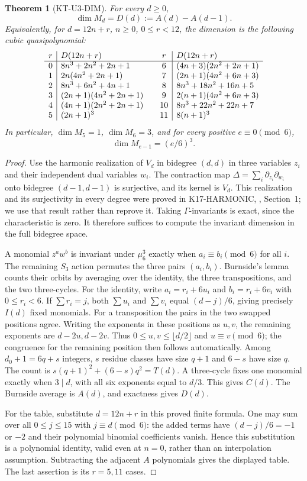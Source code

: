 \documentclass[11pt,a4paper]{article}
\newtheorem{theorem}{Theorem}[section]
\theoremstyle{definition}
\begin{document}
\begin{theorem}[KT-U3-DIM]
For every $d\geq0$,
\[
       \dim M_d=D(d):=A(d)-A(d-1).
\]
Equivalently, for $d=12n+r$, $n\geq0$, $0\leq r<12$, the
dimension is the following cubic quasipolynomial:
\[
\begin{array}{c|l@{\qquad}c|l}
r&D(12n+r)&r&D(12n+r)\\\hline
0&8n^3+2n^2+2n+1&6&(4n+3)(2n^2+2n+1)\\
1&2n(4n^2+2n+1)&7&(2n+1)(4n^2+6n+3)\\
2&8n^3+6n^2+4n+1&8&8n^3+18n^2+16n+5\\
3&(2n+1)(4n^2+2n+1)&9&2(n+1)(4n^2+6n+3)\\
4&(4n+1)(2n^2+2n+1)&10&8n^3+22n^2+22n+7\\
5&(2n+1)^3&11&8(n+1)^3
\end{array}
\]
In particular, $\dim M_5=1$, $\dim M_6=3$, and for every
positive $e\equiv0\pmod6$,
\[
                    \dim M_{e-1}=(e/6)^3.
\]
\end{theorem}
\begin{proof}
Use the harmonic realization of $V_d$ in bidegree $(d,d)$ in
three variables $z_i$ and their independent dual variables $w_i$.
The contraction map
$\Delta=\sum_i\partial_{z_i}\partial_{w_i}$ onto bidegree
$(d-1,d-1)$ is surjective, and its kernel is $V_d$.
This realization and its surjectivity in every degree were proved in
K17-HARMONIC, , Section~1;
we use that result rather than reprove it.
Taking $\Gamma$-invariants is exact, since the characteristic is zero.
It therefore suffices to compute the invariant dimension in the full
bidegree space.

A monomial $z^a w^b$ is invariant under $\mu_6^3$ exactly when
$a_i\equiv b_i\pmod6$ for all $i$.
The remaining $S_3$ action permutes the three pairs $(a_i,b_i)$.
Burnside's lemma counts their orbits by averaging over the identity,
the three transpositions, and the two three-cycles.
For the identity, write $a_i=r_i+6u_i$ and $b_i=r_i+6v_i$ with
$0\leq r_i<6$. If $\sum r_i=j$, both $\sum u_i$ and $\sum v_i$
equal $(d-j)/6$, giving precisely $I(d)$ fixed monomials.
For a transposition the pairs in the two swapped positions agree.
Writing the exponents in these positions as $u,v$, the remaining
exponents are $d-2u,d-2v$. Thus $0\leq u,v\leq\lfloor d/2\rfloor$
and $u\equiv v\pmod6$; the congruence for the remaining position
then follows automatically. Among $d_0+1=6q+s$ integers, $s$
residue classes have size $q+1$ and $6-s$ have size $q$.
The count is $s(q+1)^2+(6-s)q^2=T(d)$.
A three-cycle fixes one monomial exactly when $3\mid d$, with
all six exponents equal to $d/3$. This gives $C(d)$.
The Burnside average is $A(d)$, and exactness gives $D(d)$.

For the table, substitute $d=12n+r$ in this proved finite formula.
One may sum over all $0\leq j\leq15$ with $j\equiv d\pmod6$:
the added terms have $(d-j)/6=-1$ or $-2$ and their polynomial
binomial coefficients vanish. Hence this substitution is a polynomial
identity, valid even at $n=0$, rather than an interpolation assumption.
Subtracting the adjacent $A$ polynomials gives the displayed table.
The last assertion is its $r=5,11$ cases.
\end{proof}
\end{document}
